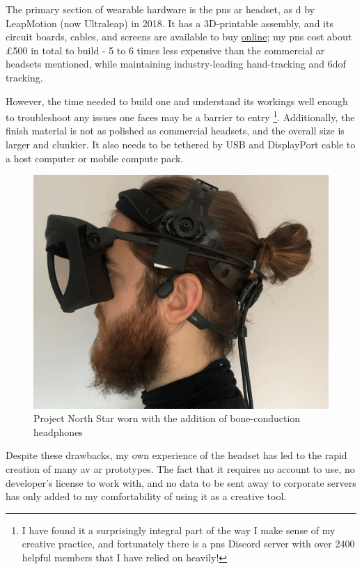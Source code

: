 The primary section of wearable hardware is the \gls{pns} \gls{ar} headset, as d by LeapMotion (now Ultraleap) in 2018. It has a 3D-printable assembly, and its circuit boards, cables, and screens are available to buy \href{https://docs.projectnorthstar.org}{online}; my \gls{pns} cost about \pounds500 in total to build - 5 to 6 times less expensive than the commercial \gls{ar} headsets mentioned, while maintaining industry-leading hand-tracking and \gls{6dof} tracking.

However, the time needed to build one and understand its workings well enough to trouble\-shoot any issues one faces may be a barrier to entry \footnote{I have found it a surprisingly integral part of the way I make sense of my creative practice, and fortunately there is a \gls{pns} Discord server with over 2400 helpful members that I have relied on heavily!}. Additionally, the finish material is not as polished as commercial headsets, and the overall size is larger and clunkier. It also needs to be tethered by USB and DisplayPort cable to a host computer or mobile compute pack.

\begin{figure}
    \vspace{-\intextsep}
    \hfill
    \begin{minipage}{0.95\linewidth}
            \includegraphics[width=\linewidth]{figures/06-polaris/polaris-framework-hardware-bc.png}
            \captionsetup{justification=justified}
            \caption{Project North Star worn with the addition of bone-conduction headphones}\label{fig: polaris-framework-hardware-bc}
    \end{minipage}
\end{figure}
Despite these drawbacks, my own experience of the headset has led to the rapid creation of many \gls{av} \gls{ar} prototypes. The fact that it requires no account to use, no developer's license to work with, and no data to be sent away to corporate servers has only added to my comfortability of using it as a creative tool.

